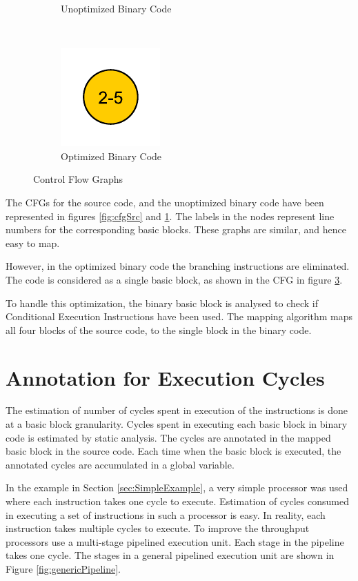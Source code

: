 \begin{figure}[h!]
\begin{subfigure}[t]{.33\textwidth}
\caption{Unoptimized Binary Code}
\label{fig:cfgUnopt}
\end{subfigure}%
~
\begin{subfigure}[t]{.33\textwidth}
\centering
\captionsetup{margin=10pt}
\includegraphics[width=.5\textwidth]{figures/CondExecObjOptFlowChart.pdf}
\caption{Optimized Binary Code}
\label{fig:cfgOpt}
\end{subfigure}
\caption{Control Flow Graphs}
\end{figure}

The CFGs for the source code, and the unoptimized binary code have been represented in figures \ref{fig:cfgSrc} and \ref{fig:cfgUnopt}. The labels in the nodes represent line numbers for the corresponding basic blocks. These graphs are similar, and hence easy to map. 

However, in the optimized binary code the branching instructions are eliminated. The code is considered as a single basic block, as shown in the CFG in figure \ref{fig:cfgOpt}.

To handle this optimization, the binary basic block is analysed to check if Conditional Execution Instructions have been used. The mapping algorithm maps all four blocks of the source code, to the single block in the binary code. 

\section{Annotation for Execution Cycles}
The estimation of number of cycles spent in execution of the instructions is done at a basic block granularity. Cycles spent in executing each basic block in binary code is estimated by static analysis. The cycles are annotated in the mapped basic block in the source code. Each time when the basic block is executed, the annotated cycles are accumulated in a global variable.

In the example in Section \ref{sec:SimpleExample}, a very simple processor was used where each instruction takes one cycle to execute. Estimation of cycles consumed in executing a set of instructions in such a processor is easy. In reality, each instruction takes multiple cycles to execute. To improve the throughput processors use a multi-stage pipelined execution unit. Each stage in the pipeline takes one cycle. The stages in a general pipelined execution unit are shown in Figure \ref{fig:genericPipeline}.

